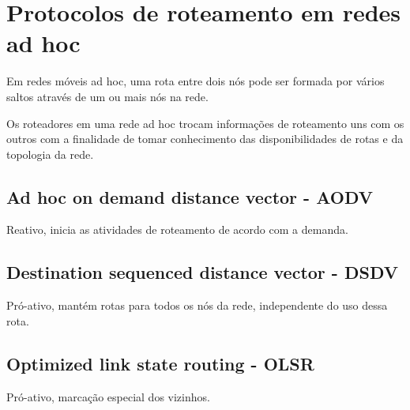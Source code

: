 \section{Protocolos de roteamento em redes ad hoc}
Em redes m\'oveis ad hoc, uma rota entre dois n\'os pode ser formada por v\'arios saltos atrav\'es de um ou mais n\'os na rede. 

Os roteadores em uma rede ad hoc trocam informa\c{c}\~oes de roteamento uns com os outros com a finalidade de tomar conhecimento das disponibilidades de rotas e da topologia da rede.\cite{pereira}

\subsection{Ad hoc on demand distance vector - AODV}
Reativo, inicia as atividades de roteamento de acordo com a demanda.


\subsection{Destination sequenced distance vector - DSDV}
Pr\'o-ativo, mant\'em rotas para todos os n\'os da rede, independente do uso dessa rota.


\subsection{Optimized link state routing - OLSR}
Pr\'o-ativo, marca\c{c}\~ao especial dos vizinhos.

